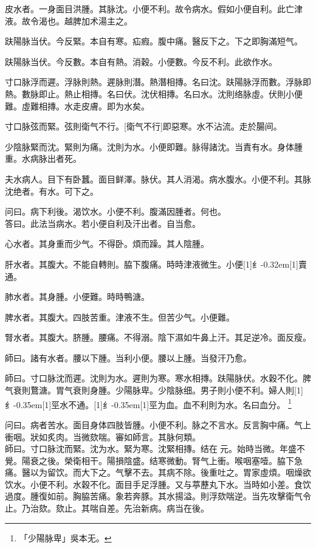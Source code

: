 \documentclass[11pt,oneside,b5paper]{ctexbook}
\begin{document}
\begin{flushleft}
皮水者。一身面目洪腫。其脉沈。小便不利。故令病水。假如小便自利。此亡津液。故令渴也。越脾加术湯主之。

趺陽脉当伏。今反緊。本自有寒。疝瘕。腹中痛。醫反下之。下之即胸滿短气。

趺陽脉当伏。今反數。本自有熱。消穀。小便數。今反不利。此欲作水。

寸口脉浮而遲。浮脉則熱。遲脉則潛。熱潛相摶。名曰沈。趺陽脉浮而數。浮脉即熱。數脉即止。熱止相摶。名曰伏。沈伏相摶。名曰水。沈則络脉虛。伏則小便難。虛難相摶。水走皮膚。即为水矣。

寸口脉弦而緊。弦則衛气不行。[衛气不行]即惡寒。水不沾流。走於腸间。

少陰脉緊而沈。緊則为痛。沈則为水。小便即難。脉得諸沈。当責有水。身体腫重。水病脉出者死。

夫水病人。目下有卧蠶。面目鲜澤。脉伏。其人消渴。病水腹水。小便不利。其脉沈绝者。有水。可下之。

问曰。病下利後。渴饮水。小便不利。腹滿因腫者。何也。\\
答曰。此法当病水。若小便自利及汗出者。自当愈。

心水者。其身重而少气。不得卧。煩而躁。其人陰腫。

肝水者。其腹大。不能自轉則。脇下腹痛。時時津液微生。小便{\hbox{\scalebox{0.6}[1]{纟}\kern-0.32em\scalebox{0.7}[1]{賣}}}通。

肺水者。其身腫。小便難。時時鴨溏。

脾水者。其腹大。四肢苦重。津液不生。但苦少气。小便難。

腎水者。其腹大。脐腫。腰痛。不得溺。陰下濕如牛鼻上汗。其足逆冷。面反瘦。

師曰。諸有水者。腰以下腫。当利小便。腰以上腫。当發汗乃愈。

師曰。寸口脉沈而遲。沈則为水。遲則为寒。寒水相摶。趺陽脉伏。水穀不化。脾气衰則鶩溏。胃气衰則身腫。少陽脉卑。少陰脉细。男子則小便不利。婦人則{\hbox{\scalebox{0.68}[1]{纟}\kern-0.35em\scalebox{0.64}[1]{巠}}}水不通。{\hbox{\scalebox{0.68}[1]{纟}\kern-0.35em\scalebox{0.64}[1]{巠}}}为血。血不利則为水。名曰血分。
\footnote{「少陽脉卑」吳本无。}

问曰。病者苦水。面目身体四肢皆腫。小便不利。脉之不言水。反言胸中痛。气上衝咽。狀如炙肉。当微欬喘。審如師言。其脉何類。\\
師曰。寸口脉沈而緊。沈为水。緊为寒。沈緊相摶。结在{𬮦}元。始時当微。年盛不覺。陽衰之後。榮衛相干。陽損陰盛。结寒微動。腎气上衝。喉咽塞噎。脇下急痛。醫以为留饮。而大下之。气擊不去。其病不除。後重吐之。胃家虛煩。咽燥欲饮水。小便不利。水穀不化。面目手足浮腫。又与葶藶丸下水。当時如小差。食饮過度。腫復如前。胸脇苦痛。象若奔豚。其水揚溢。則浮欬喘逆。当先攻擊衛气令止。乃治欬。欬止。其喘自差。先治新病。病当在後。


\end{flushleft}
\end{document}
